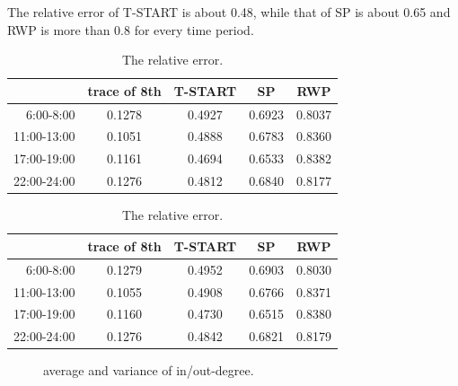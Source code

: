 The relative error of T-START is about 0.48, while that of SP is about 0.65 and RWP is more than 0.8 for every time period.  
\begin{table}[!h]
\caption{The relative error.}\label{table_relative_err}
\centering
\begin{tabular}{r|c|c|c|c}
\hline
	&trace of 8th	&T-START &SP &RWP\\
\hline
 6:00-8:00&
0.1278&	0.4927&	0.6923&	0.8037\\ 
 11:00-13:00&
0.1051&	0.4888&	0.6783&	0.8360\\
 17:00-19:00&
0.1161&	0.4694&	0.6533&	0.8382\\
 22:00-24:00&
0.1276&	0.4812&	0.6840&	0.8177\\
\hline
\end{tabular}
\begin{tabular}{r|c|c|c|c}
\hline
	&trace of 8th	&T-START &SP&RWP\\
\hline
 6:00-8:00&
0.1279&	0.4952&	0.6903&	0.8030\\
 11:00-13:00&
0.1055&	0.4908&	0.6766&	0.8371\\
 17:00-19:00&
0.1160&	0.4730&	0.6515&	0.8380\\
 22:00-24:00&
0.1276&	0.4842&	0.6821&	0.8179\\
\hline
\end{tabular}
\end{table}
\begin{figure}[!t]
\centering
{}
\caption{average and variance of in/out-degree.}\label{figure_avg}
\end{figure}
